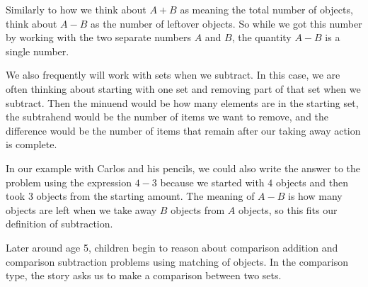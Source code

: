 \documentclass{ximera}
\begin{document}
Similarly to how we think about $A+B$ as meaning the total number of objects, think about $A-B$ as the number of leftover objects. So while we got this number by working with the two separate numbers $A$ and $B$, the quantity $A-B$ is a single number. 

We also frequently will work with sets when we subtract. In this case, we are often thinking about starting with one set and removing part of that set when we subtract. Then the minuend would be how many elements are in the starting set, the subtrahend would be the number of items we want to remove, and the difference would be the number of items that remain after our taking away action is complete.

In our example with Carlos and his pencils, we could also write the answer to the problem using the expression $4-3$ because we started with $4$ objects and then took $3$ objects from the starting amount. The meaning of $A-B$ is how many objects are left when we take away $B$ objects from $A$ objects, so this fits our definition of subtraction.


Later around age 5, children begin to reason about comparison addition and comparison subtraction problems using matching of objects. In the comparison type, the story asks us to make a comparison between two sets.
\end{document}
